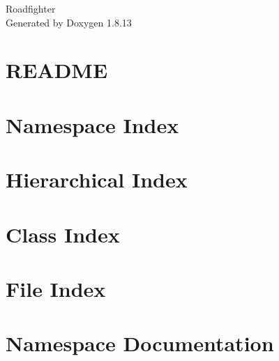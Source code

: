 \documentclass[twoside]{book}
\newcommand{\+}{\discretionary{\mbox{\scriptsize$\hookleftarrow$}}{}{}}
\newcommand{\clearemptydoublepage}{%
  \newpage{\pagestyle{empty}\cleardoublepage}%
}
\begin{document}
\hypersetup{pageanchor=false,
             bookmarksnumbered=true,
             pdfencoding=unicode
            }
\begin{titlepage}
\vspace*{7cm}
\begin{center}%
{\Large Roadfighter }\\
\vspace*{1cm}
{\large Generated by Doxygen 1.8.13}\\
\end{center}
\end{titlepage}
\clearemptydoublepage
{}
\tableofcontents
\clearemptydoublepage
{}
\hypersetup{pageanchor=true}

\chapter{R\+E\+A\+D\+ME}
\label{md_README}

\chapter{Namespace Index}

\chapter{Hierarchical Index}

\chapter{Class Index}

\chapter{File Index}

\chapter{Namespace Documentation}

\end{document}
